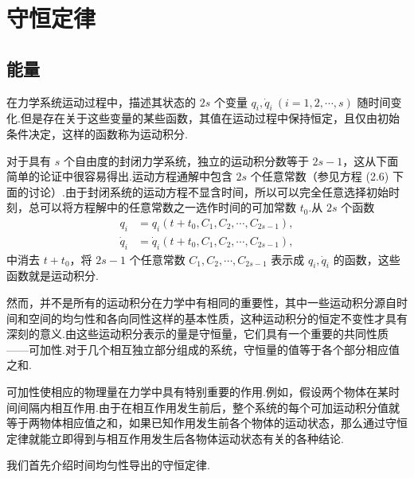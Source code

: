 \chapter{守恒定律}

\section{能量}

在力学系统运动过程中，描述其状态的 $2s$ 个变量 $q_i,\dot{q}_i\ (i=1,2,\cdots,s)$ 随时间变化.但是存在关于这些变量的某些函数，其值在运动过程中保持恒定，且仅由初始条件决定，这样的函数称为运动积分.

对于具有 $s$ 个自由度的封闭力学系统，独立的运动积分数等于 $2s-1$，这从下面简单的论证中很容易得出.运动方程通解中包含 $2s$ 个任意常数（参见方程 (2.6) 下面的讨论）.由于封闭系统的运动方程不显含时间，所以可以完全任意选择初始时刻，总可以将方程解中的任意常数之一选作时间的可加常数 $t_0$.从 $2s$ 个函数
\begin{equation*}
\begin{aligned}
  q_i&=q_i\left(t+t_0,C_1,C_2,\cdots,C_{2s-1}\right),\\
  \dot{q}_i&=\dot{q}_i\left(t+t_0,C_1,C_2,\cdots,C_{2s-1}\right),
\end{aligned}
\end{equation*}
中消去 $t+t_0$，将 $2s-1$ 个任意常数 $C_1,C_2,\cdots,C_{2s-1}$ 表示成 $q_i,\dot{q}_i$ 的函数，这些函数就是运动积分.

然而，并不是所有的运动积分在力学中有相同的重要性，其中一些运动积分源自时间和空间的均匀性和各向同性这样的基本性质，这种运动积分的恒定不变性才具有深刻的意义.由这些运动积分表示的量是守恒量，它们具有一个重要的共同性质——可加性.对于几个相互独立部分组成的系统，守恒量的值等于各个部分相应值之和.

可加性使相应的物理量在力学中具有特别重要的作用.例如，假设两个物体在某时间间隔内相互作用.由于在相互作用发生前后，整个系统的每个可加运动积分值就等于两物体相应值之和，如果已知作用发生前各个物体的运动状态，那么通过守恒定律就能立即得到与相互作用发生后各物体运动状态有关的各种结论.

我们首先介绍时间均匀性导出的守恒定律.

